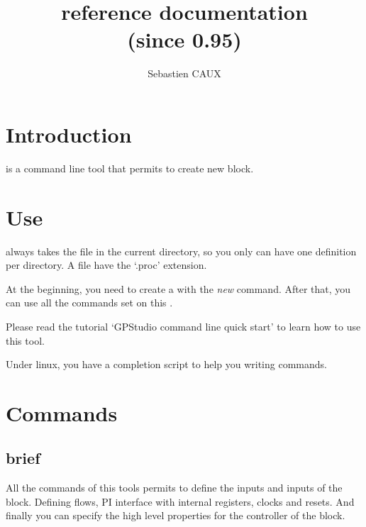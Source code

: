 \documentclass[10pt,a4paper]{article}
\author{Sebastien CAUX}
\title{\tool{} reference documentation \version \\ (since 0.95)}
\begin{document}
\maketitle
\section{Introduction}
\tool{} is a command line tool that permits to create new \kind{} block.

\section{Use}
\tool{} always takes the \kind{} file in the current directory, so you only can have one \kind{} definition per directory. A \kind{} file have the `.proc' extension.

At the beginning, you need to create a \kind{} with the \emph{new\kind{}} command. After that, you can use all the commands set on this \kind{}.

Please read the tutorial `GPStudio command line quick start' to learn how to use this tool.

Under linux, you have a completion script to help you writing commands.


\section{Commands}
\subsection{brief}
All the commands of this tools permits to define the inputs and inputs of the block. Defining flows, PI interface with internal registers, clocks and resets. And finally you can specify the high level properties for the controller of the block.
\end{document}

